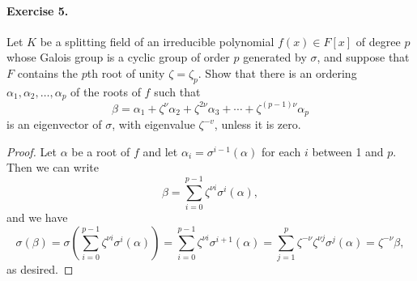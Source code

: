 \documentclass{article}
\begin{document}
\paragraph{Exercise 5.} Let $K$ be  a splitting field of an
irreducible polynomial $f(x)\in F[x]$ of degree $p$ whose Galois group
is a cyclic group of order $p$ generated by $\sigma$, and suppose that
$F$ contains the $p$th root of unity $\zeta=\zeta_p$. Show that there
is an ordering $\alpha_1,\alpha_2,\ldots,\alpha_p$ of the roots of $f$
such that
$$\beta=\alpha_1+\zeta^\nu\alpha_2+\zeta^{2\nu}\alpha_3+\cdots+\zeta^{(p-1)\nu}\alpha_p$$
is an eigenvector of $\sigma$, with eigenvalue $\zeta^{-v}$, unless it
is zero. 
 
\begin{proof}
Let $\alpha$ be a root of  $f$ and let $\alpha_i=\sigma^{i-1}(\alpha)$ for each $i$ between 1 and $p$. Then we can write
$$\beta=\sum_{i=0}^{p-1} \zeta^{\nu i}\sigma^i(\alpha),$$
and we have
$$\sigma(\beta)=\sigma\left(\sum_{i=0}^{p-1} \zeta^{\nu i}\sigma^i(\alpha)\right)=\sum_{i=0}^{p-1}\zeta^{\nu i}\sigma^{i+1}(\alpha)
=\sum_{j=1}^{p}\zeta^{-\nu}\zeta^{\nu j}\sigma^{j}(\alpha)=\zeta^{-\nu}\beta,$$
as desired.
\end{proof}
\end{document}

